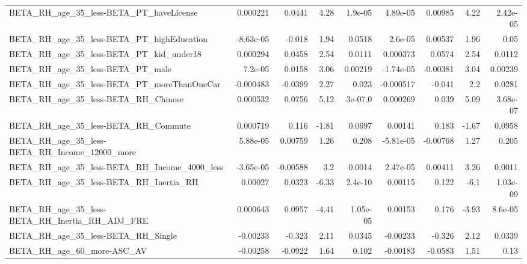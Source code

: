 \begin{tabular}{lrrrrrrrr}
BETA\_RH\_age\_35\_less-BETA\_PT\_haveLicense            &    0.000221 &       0.0441 &     4.28 &  1.9e-05 &   4.89e-05 &     0.00985 &         4.22 &      2.42e-05 \\
BETA\_RH\_age\_35\_less-BETA\_PT\_highEducation          &   -8.63e-05 &       -0.018 &     1.94 &   0.0518 &    2.6e-05 &     0.00537 &         1.96 &          0.05 \\
BETA\_RH\_age\_35\_less-BETA\_PT\_kid\_under18            &    0.000294 &       0.0458 &     2.54 &   0.0111 &   0.000373 &      0.0574 &         2.54 &        0.0112 \\
BETA\_RH\_age\_35\_less-BETA\_PT\_male                   &     7.2e-05 &       0.0158 &     3.06 &  0.00219 &  -1.74e-05 &    -0.00381 &         3.04 &       0.00239 \\
BETA\_RH\_age\_35\_less-BETA\_PT\_moreThanOneCar         &   -0.000483 &      -0.0399 &     2.27 &    0.023 &  -0.000517 &      -0.041 &          2.2 &        0.0281 \\
BETA\_RH\_age\_35\_less-BETA\_RH\_Chinese                &    0.000532 &       0.0756 &     5.12 &  3e-07.0 &   0.000269 &       0.039 &         5.09 &      3.68e-07 \\
BETA\_RH\_age\_35\_less-BETA\_RH\_Commute                &    0.000719 &        0.116 &    -1.81 &   0.0697 &    0.00141 &       0.183 &        -1.67 &        0.0958 \\
BETA\_RH\_age\_35\_less-BETA\_RH\_Income\_12000\_more      &    5.88e-05 &      0.00759 &     1.26 &    0.208 &  -5.81e-05 &    -0.00768 &         1.27 &         0.205 \\
BETA\_RH\_age\_35\_less-BETA\_RH\_Income\_4000\_less       &   -3.65e-05 &     -0.00588 &      3.2 &   0.0014 &   2.47e-05 &     0.00411 &         3.26 &        0.0011 \\
BETA\_RH\_age\_35\_less-BETA\_RH\_Inertia\_RH             &     0.00027 &       0.0323 &    -6.33 &  2.4e-10 &    0.00115 &       0.122 &         -6.1 &      1.03e-09 \\
BETA\_RH\_age\_35\_less-BETA\_RH\_Inertia\_RH\_ADJ\_FRE     &    0.000643 &       0.0957 &    -4.41 & 1.05e-05 &    0.00153 &       0.176 &        -3.93 &       8.6e-05 \\
BETA\_RH\_age\_35\_less-BETA\_RH\_Single                 &    -0.00233 &       -0.323 &     2.11 &   0.0345 &   -0.00233 &      -0.326 &         2.12 &        0.0339 \\
BETA\_RH\_age\_60\_more-ASC\_AV                         &    -0.00258 &      -0.0922 &     1.64 &    0.102 &   -0.00183 &     -0.0583 &         1.51 &          0.13 \\

\end{tabular}
